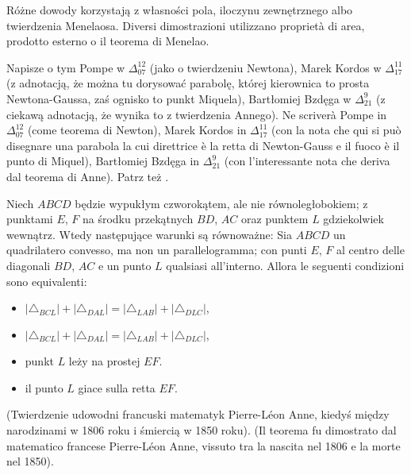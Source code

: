 Różne dowody korzystają z własności pola, iloczynu zewnętrznego albo twierdzenia Menelaosa. %
Diversi dimostrazioni utilizzano proprietà di area, prodotto esterno o il teorema di Menelao. %

Napisze o tym Pompe w $\Delta_{07}^{12}$ (jako o twierdzeniu Newtona), Marek Kordos w $\Delta_{17}^{11}$ (z adnotacją, że można tu dorysować parabolę, której kierownica to prosta Newtona-Gaussa, zaś ognisko to punkt Miquela), Bartłomiej Bzdęga w $\Delta_{21}^9$ (z ciekawą adnotacją, że wynika to z twierdzenia Annego). %
Ne scriverà Pompe in $\Delta_{07}^{12}$ (come teorema di Newton), Marek Kordos in $\Delta_{17}^{11}$ (con la nota che qui si può disegnare una parabola la cui direttrice è la retta di Newton-Gauss e il fuoco è il punto di Miquel), Bartłomiej Bzdęga in $\Delta_{21}^9$ (con l'interessante nota che deriva dal teorema di Anne). %
Patrz też \cite[s. 108]{neugebauer_2018}. %

\begin{theorem}
[Annego] %
[di Anne] %
Niech $ABCD$ będzie wypukłym czworokątem, ale nie równoległobokiem; z punktami $E$, $F$ na środku przekątnych $BD$, $AC$ oraz punktem $L$ gdziekolwiek wewnątrz. %
Wtedy następujące warunki są równoważne: %
Sia $ABCD$ un quadrilatero convesso, ma non un parallelogramma; con punti $E$, $F$ al centro delle diagonali $BD$, $AC$ e un punto $L$ qualsiasi all'interno. %
Allora le seguenti condizioni sono equivalenti: %
\begin{itemize}
	\item $|\triangle_{BCL}| + |\triangle_{DAL}| = |\triangle_{LAB}| + |\triangle_{DLC}|$, %
	\item $|\triangle_{BCL}| + |\triangle_{DAL}| = |\triangle_{LAB}| + |\triangle_{DLC}|$, %
	\item punkt $L$ leży na prostej $EF$. %
	\item il punto $L$ giace sulla retta $EF$. %
\end{itemize}
\end{theorem}

(Twierdzenie udowodni francuski matematyk Pierre-Léon Anne, kiedyś między narodzinami w 1806 roku i śmiercią w 1850 roku). %
(Il teorema fu dimostrato dal matematico francese Pierre-Léon Anne, vissuto tra la nascita nel 1806 e la morte nel 1850). %
%

